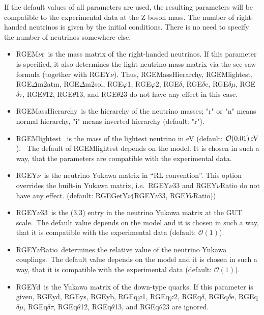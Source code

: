 \documentclass[10pt,a4paper,twoside]{scrartcl}
\begin{document}
If the default values of all parameters are used, the resulting parameters will
be compatible to the experimental data at the Z boson mass. The number of right-handed neutrinos is given by the initial conditions. There
is no need to specify the number of neutrinos somewhere else.
\begin{itemize}
\item RGEM$\nu$r\ is the mass matrix of the right-handed neutrinos.
  If this parameter is specified, it also determines the light neutrino
  mass matrix via the see-saw formula (together with RGEY$\nu$).  Thus,
  RGEMassHierarchy, RGEMlightest, RGE$\Delta$m2atm, RGE$\Delta$m2sol,
  RGE$\varphi$1, RGE$\varphi$2, RGE$\delta$, RGE$\delta$e,
  RGE$\delta\mu$, RGE$\delta\tau$, RGE$\theta$12, RGE$\theta$13, and
  RGE$\theta$23 do not have any effect in this case.
  
\item RGEMassHierarchy\ is the hierarchy of the neutrino masses; "r" or "n"
  means normal hierarchy, "i" means inverted hierarchy (default: "r").
  
\item RGEMlightest \ is the mass of the lightest neutrino in eV (default: $\mathcal{O}(0.01)
  \,\mathrm{eV}$).
  \ The default of RGEMlightest depends on the
model. It is chosen in such a way, that the parameters are compatible with the
experimental data.
\item RGEY$\nu$\ is the neutrino Yukawa matrix in ``RL convention''. This option overrides the
  built-in Yukawa matrix, i.e.\ RGEY$\nu33$ and RGEY$\nu$Ratio do not have any
  effect. 
    (default: RGEGetY$\nu$(RGEY$\nu33$, RGE$Y\nu$Ratio))
  
\item RGEY$\nu$33\ is the (3,3) entry in the neutrino Yukawa matrix at the GUT
  scale.\ The default value depends on the
  model and it is chosen in such a way, that it is compatible with the
  experimental data (default: $\mathcal{O}(1)$).
  
\item RGEY$\nu$Ratio\ determines the relative value of the neutrino Yukawa couplings.\ The default value depends on the
  model and it is chosen in such a way, that it is compatible with the
  experimental data (default: $\mathcal{O}(1)$).
\item RGEYd\ is the Yukawa matrix of the down-type quarks.
  If this parameter is given, RGEyd, RGEys, RGEyb, RGEq$\varphi$1,
  RGEq$\varphi$2, RGEq$\delta$, RGEq$\delta$e, RGEq$\delta\mu$,
  RGEq$\delta\tau$, RGEq$\theta$12, RGEq$\theta$13, and RGEq$\theta$23
  are ignored.
  

\end{itemize}
\end{document}
